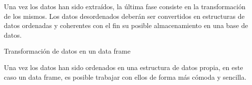 Una vez los datos han sido extraídos, la última fase consiste en la transformación de los mismos. Los datos
desordenados deberán ser convertidos en estructuras de datos ordenadas y coherentes con el fin su posible
almacenamiento en una base de datos.

\begin{codefloat}

\caption{Transformación de datos en un data frame}
\label{cod:transformacion de datos en un data frame}
\end{codefloat}



Una vez los datos han sido ordenados en una estructura de datos propia, en este caso un data frame, es
posible trabajar con ellos de forma más cómoda y sencilla.







